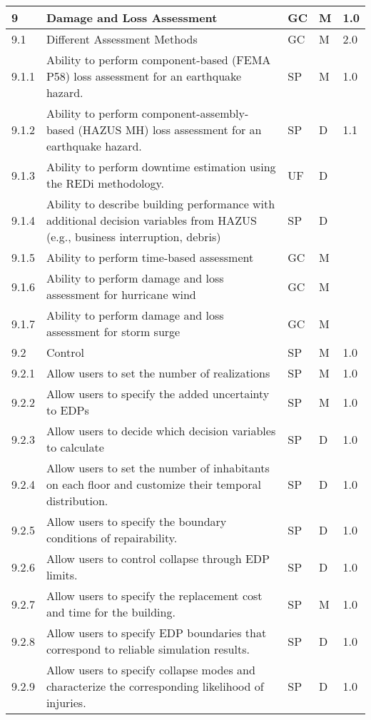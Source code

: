 \begin{longtable}{| p{} | p{} | p{} | p{} |  p{} |}
9 & \textbf{Damage and Loss Assessment} & GC & M & 1.0\\ \hline
9.1 & Different Assessment Methods & GC & M & 2.0 \\ \hline
9.1.1 & Ability to perform component-based (FEMA P58) loss assessment for an earthquake hazard. & SP & M & 1.0 \\ \hline
9.1.2 & Ability to perform component-assembly-based (HAZUS MH) loss assessment for an earthquake hazard. & SP & D & 1.1 \\ \hline
9.1.3 & Ability to perform downtime estimation using the REDi methodology. & UF & D & \\ \hline
9.1.4 & Ability to describe building performance with additional decision variables from HAZUS (e.g., business interruption, debris) & SP & D &  \\ \hline
9.1.5 &  Ability to perform time-based assessment & GC & M &  \\ \hline
9.1.6 & Ability to perform damage and loss assessment for hurricane wind & GC & M &  \\ \hline
9.1.7 & Ability to perform damage and loss assessment for storm surge & GC & M &  \\ \hline
9.2 & Control & SP & M & 1.0 \\ \hline
9.2.1 & Allow users to set the number of realizations & SP & M & 1.0\\ \hline
9.2.2 &  Allow users to specify the added uncertainty to EDPs & SP & M & 1.0 \\ \hline
9.2.3 &  Allow users to decide which decision variables to calculate & SP & D & 1.0 \\ \hline
9.2.4 &  Allow users to set the number of inhabitants on each floor and customize their temporal distribution. & SP & D & 1.0 \\ \hline
9.2.5 &  Allow users to specify the boundary conditions of repairability. & SP & D & 1.0 \\ \hline
9.2.6 &  Allow users to control collapse through EDP limits. & SP & D & 1.0\\ \hline
9.2.7 &  Allow users to specify the replacement cost and time for the building. & SP & M & 1.0 \\ \hline
9.2.8 &  Allow users to specify EDP boundaries that correspond to reliable simulation results. & SP & D & 1.0\\ \hline
9.2.9 & Allow users to specify collapse modes and characterize the corresponding likelihood of injuries. & SP & D & 1.0\\ \hline

\end{longtable}
